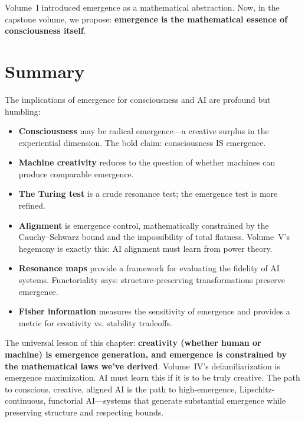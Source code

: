 Volume~I introduced emergence as a mathematical abstraction. Now, in the
capstone volume, we propose: \textbf{emergence is the mathematical essence of
consciousness itself}.


\section{Summary}

The implications of emergence for consciousness and AI are profound but humbling:

\begin{itemize}
  \item \textbf{Consciousness} may be radical emergence---a creative surplus in
    the experiential dimension. The bold claim: consciousness IS emergence.
  \item \textbf{Machine creativity} reduces to the question of whether machines
    can produce comparable emergence.
  \item \textbf{The Turing test} is a crude resonance test; the emergence test
    is more refined.
  \item \textbf{Alignment} is emergence control, mathematically constrained by
    the Cauchy--Schwarz bound and the impossibility of total flatness. Volume~V's
    hegemony is exactly this: AI alignment must learn from power theory.
  \item \textbf{Resonance maps} provide a framework for evaluating the fidelity
    of AI systems. Functoriality says: structure-preserving transformations
    preserve emergence.
  \item \textbf{Fisher information} measures the sensitivity of emergence and
    provides a metric for creativity vs. stability tradeoffs.
\end{itemize}

The universal lesson of this chapter: \textbf{creativity (whether human or
machine) is emergence generation, and emergence is constrained by the
mathematical laws we've derived}. Volume~IV's defamiliarization is emergence
maximization. AI must learn this if it is to be truly creative. The path to
conscious, creative, aligned AI is the path to high-emergence, Lipschitz-continuous,
functorial AI---systems that generate substantial emergence while preserving
structure and respecting bounds.



